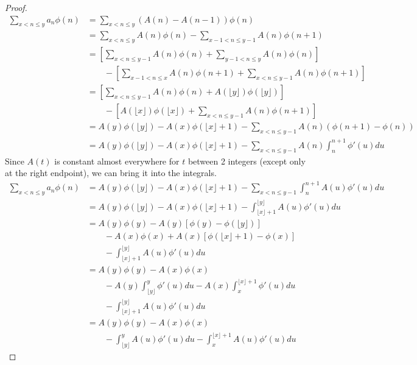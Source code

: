 \documentclass{article}
\theoremstyle{definition}
\begin{document}
\begin{shaded}
\begin{proof}
\begin{align*}
\sum_{x < n \leq y} a_n \phi(n) & = \sum_{x < n \leq y} (A(n) - A(n-1)) \phi(n)
\\
& = \sum_{x < n \leq y} A(n) \phi(n) - \sum_{x-1 < n \leq y-1} A(n) \phi(n+1)
\\
& = \left[ \sum_{x < n \leq y - 1} A(n) \phi(n) + \sum_{y - 1 < n \leq y} A(n) \phi(n) \right]
\\
& \qquad - \left[ \sum_{x - 1 < n \leq x} A(n) \phi(n+1) + \sum_{x < n \leq y - 1} A(n) \phi(n+1) \right]
\\
& = \left[ \sum_{x < n \leq y - 1} A(n) \phi(n) + A(\lfloor y \rfloor) \phi (\lfloor y \rfloor) \right]
\\
& \qquad - \left[ A(\lfloor x \rfloor) \phi (\lfloor x \rfloor) + \sum_{x< n \leq y-1} A(n) \phi(n+1) \right]
\\
& = A(y) \phi (\lfloor y \rfloor) -  A(x) \phi (\lfloor x \rfloor + 1) - \sum_{x < n \leq y - 1} A(n) \left( \phi(n+1) - \phi(n) \right)
\\
& = A(y) \phi (\lfloor y \rfloor) -  A(x) \phi (\lfloor x \rfloor + 1) - \sum_{x < n \leq y - 1} A(n) \int_n^{n + 1} \phi'(u) du
\end{align*}
Since $A(t)$ is constant almost everywhere for $t$ between 2 integers (except only at the right endpoint), we can bring it into the integrals.
\begin{align*}
\sum_{x < n \leq y} a_n \phi(n) & = A(y) \phi (\lfloor y \rfloor) -  A(x) \phi (\lfloor x \rfloor + 1) - \sum_{x < n \leq y - 1} \int_n^{n + 1} A(u) \phi'(u) du
\\
& = A(y) \phi (\lfloor y \rfloor) -  A(x) \phi (\lfloor x \rfloor + 1) - \int_{\lfloor x \rfloor + 1}^{\lfloor y \rfloor} A(u) \phi'(u) du
\\
& = A(y) \phi(y) - A(y) \left[ \phi(y) - \phi (\lfloor y \rfloor) \right]
\\
& \qquad - A(x) \phi(x) + A(x) \left[ \phi (\lfloor x \rfloor + 1) - \phi(x) \right]
\\
& \qquad - \int_{\lfloor x \rfloor + 1}^{\lfloor y \rfloor} A(u) \phi'(u) du
\\
& = A(y) \phi(y) - A(x) \phi(x)
\\
& \qquad - A(y) \int_{\lfloor y \rfloor}^y \phi'(u) du - A(x) \int_x^{\lfloor x \rfloor + 1} \phi'(u) du
\\
& \qquad - \int_{\lfloor x \rfloor + 1}^{\lfloor y \rfloor} A(u) \phi'(u) du
\\
& = A(y) \phi(y) - A(x) \phi(x)
\\
& \qquad - \int_{\lfloor y \rfloor}^y A(u) \phi'(u) du - \int_x^{\lfloor x \rfloor + 1} A(u) \phi'(u) du

\end{align*}
\end{proof}
\end{shaded}
\end{document}

